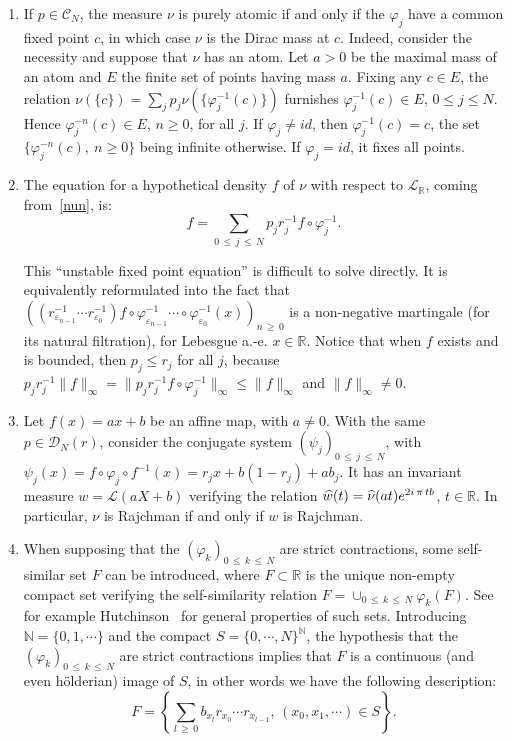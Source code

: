 \documentclass[AHL,Unicode,longabstracts,published]{cedram}
\newcommand{\Rbb}{\mathbb R}
\newcommand{\Nbb}{\mathbb N}
\newcommand{\Lcl}{\mathcal{L}}
\newcommand{\Ccl}{\mathcal{C}}
\newcommand{\Dcl}{\mathcal{D}}
\newcommand*{\romanenumi}{\renewcommand*{\theenumi}{\roman{enumi}}}
\let\oldhat\hat
\renewcommand*{\hat}[1]{\mathchoice{\widehat{#1}}{\widehat{#1}}{\oldhat{#1}}{\oldhat{#1}}}
\begin{document}
\begin{enumerate}\romanenumi
\item \label{first-i} If $p\in{\Ccl}_N$, the measure $\nu$ is purely atomic if and only if the $\varphi_j$ have a common fixed point $c$, in which case $\nu$ is the Dirac mass at $c$. Indeed, consider the necessity and suppose that $\nu$ has an atom. Let $a>0$ be the maximal mass of an atom and $E$ the finite set of points having mass $a$. Fixing any $c\in E$, the relation $\nu(\{c\})=\sum_jp_j\nu(\{\varphi_j^{-1}(c)\})$ furnishes $\varphi_j^{-1}(c)\in E$, $0\leq j\leq N$. Hence $\varphi_j^{-n}(c)\in E$, $n\geq0$, for all $j$. If $\varphi_j\not=id$, then $\varphi_j^{-1}(c)=c$, the set $\{\varphi_j^{-n}(c),~n\geq0\}$ being infinite otherwise. If $\varphi_j=id$, it fixes all points.


\item \label{first-ii}The equation for a hypothetical density $f$ of $\nu$ with respect to ${\Lcl}_{\Rbb}$, coming from~\eqref{nun}, is:
\[
f=\sum_{0\,\leq\,j\,\leq\,N}p_jr_j^{-1}f\circ \varphi_j^{-1}.
\]

This ``unstable fixed point equation'' is difficult to solve directly. It is equivalently reformulated into the fact that $((r_{\varepsilon_{n-1}}^{-1}\cdots r_{\varepsilon_0}^{-1})f\circ \varphi^{-1}_{\varepsilon_{n-1}}\cdots\circ\varphi_{\varepsilon_0}^{-1}(x))_{n\,\geq\,0}$ is a non-negative martingale (for its natural filtration), for Lebesgue a.-e. $x\in\Rbb$. Notice that when $f$ exists and is bounded, then $p_j\leq r_j$ for all $j$, because $p_jr_j^{-1}\|f\|_{\infty}=\|p_jr_j^{-1}f\circ \varphi_j^{-1}\|_{\infty}\leq \|f\|_{\infty}$ and $\|f\|_{\infty}\not=0$.

\item \label{first-iii}Let $f(x)=ax+b$ be an affine map, with $a\not=0$. With the same $p\in{\Dcl}_N(r)$, consider the conjugate system $(\psi_j)_{0\,\leq\,j\,\leq\,N}$, with $\psi_j(x)=f\circ \varphi_j\circ f^{-1}(x)=r_jx+b(1-r_j)+ab_j$. It has an invariant measure $w={\Lcl}(aX+b)$ verifying the relation $\hat{w}(t)=\hat{\nu}(at)e^{2i\,\pi\,tb}$, $t\in\Rbb$. In particular, $\nu$ is Rajchman if and only if $w$ is Rajchman.

\item \label{first-iv}When supposing that the $(\varphi_k)_{0\,\leq\,k\,\leq\,N}$ are strict contractions, some self-similar set $F$ can be introduced, where $F\subset\Rbb$ is the unique non-empty compact set verifying the self-similarity relation $F=\cup_{0\,\leq\,k\,\leq\,N}\varphi_k(F)$. See for example Hutchinson~\cite{hut} for general properties of such sets. Introducing $\Nbb=\{0,1,\cdots\}$ and the compact $S=\{0,\cdots,N\}^{\Nbb}$, the hypothesis that the $(\varphi_k)_{0\,\leq\,k\,\leq\,N}$ are strict contractions implies that $F$ is a continuous (and even h\"olderian) image of $S$, in other words we have the following description:
\[
F=\left\{{\sum_{l\,\geq\,0}b_{x_l}r_{x_0}\cdots r_{x_{l-1}},\,(x_0,x_1,\cdots)\in S}\right\}.
\]
\end{enumerate}
\end{document}
